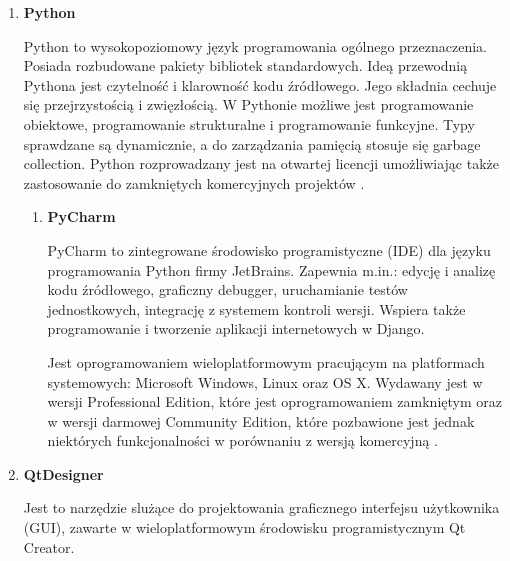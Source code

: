 \begin{enumerate}
\begin{enumerate}
	\end{enumerate}
	\item \textbf{Python}
	
	\hspace{2em}Python to wysokopoziomowy język programowania ogólnego przeznaczenia. Posiada rozbudowane pakiety bibliotek standardowych. Ideą przewodnią Pythona jest czytelność i klarowność kodu źródłowego. Jego składnia cechuje się przejrzystością i zwięzłością. W Pythonie możliwe jest programowanie obiektowe, programowanie strukturalne i programowanie funkcyjne. Typy sprawdzane są dynamicznie, a do zarządzania pamięcią stosuje się garbage collection. Python rozprowadzany jest na otwartej licencji umożliwiając także zastosowanie do zamkniętych komercyjnych projektów \cite{Python}.
	
	\begin{enumerate}
		\item \textbf{PyCharm}
		
		\hspace{2em}PyCharm to zintegrowane środowisko programistyczne (IDE) dla języku programowania Python firmy JetBrains. Zapewnia m.in.: edycję i analizę kodu źródłowego, graficzny debugger, uruchamianie testów jednostkowych, integrację z systemem kontroli wersji. Wspiera także programowanie i tworzenie aplikacji internetowych w Django.
		
		\hspace{2em}Jest oprogramowaniem wieloplatformowym pracującym na platformach systemowych: Microsoft Windows, Linux oraz OS X. Wydawany jest w wersji Professional Edition, które jest oprogramowaniem zamkniętym oraz w wersji darmowej Community Edition, które pozbawione jest jednak niektórych funkcjonalności w porównaniu z wersją komercyjną \cite{PyCharm}.
		
	\end{enumerate}
	\item \textbf{QtDesigner}
	
	\hspace{2em}Jest to narzędzie slużące do projektowania graficznego interfejsu użytkownika (GUI), zawarte w wieloplatformowym środowisku programistycznym Qt Creator.
\end{enumerate}